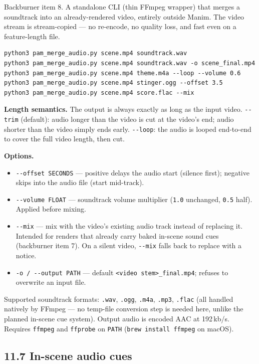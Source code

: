 \documentclass[
  12pt,
  letterpaper,
]{book}
\begin{document}
Backburner item 8. A standalone CLI (thin FFmpeg wrapper) that merges
a soundtrack into an already-rendered video, entirely outside Manim.
The video stream is stream-copied --- no re-encode, no quality loss,
and fast even on a feature-length file.

\begin{verbatim}
python3 pam_merge_audio.py scene.mp4 soundtrack.wav
python3 pam_merge_audio.py scene.mp4 soundtrack.wav -o scene_final.mp4
python3 pam_merge_audio.py scene.mp4 theme.m4a --loop --volume 0.6
python3 pam_merge_audio.py scene.mp4 stinger.ogg --offset 3.5
python3 pam_merge_audio.py scene.mp4 score.flac --mix
\end{verbatim}

\textbf{Length semantics.} The output is always exactly as long as
the input video. \texttt{-{}-trim} (default): audio longer than the
video is cut at the video's end; audio shorter than the video simply
ends early. \texttt{-{}-loop}: the audio is looped end-to-end to cover
the full video length, then cut.

\textbf{Options.}

\begin{itemize}
\item
  \texttt{-{}-offset\ SECONDS} --- positive delays the audio start
  (silence first); negative skips into the audio file (start
  mid-track).
\item
  \texttt{-{}-volume\ FLOAT} --- soundtrack volume multiplier
  (\texttt{1.0} unchanged, \texttt{0.5} half). Applied before mixing.
\item
  \texttt{-{}-mix} --- mix with the video's existing audio track
  instead of replacing it. Intended for renders that already carry
  baked in-scene sound cues (backburner item 7). On a silent video,
  \texttt{-{}-mix} falls back to replace with a notice.
\item
  \texttt{-o\ /\ -{}-output\ PATH} --- default
  \texttt{\textless{}video\ stem\textgreater{}\_final.mp4}; refuses to
  overwrite an input file.
\end{itemize}

Supported soundtrack formats: \texttt{.wav}, \texttt{.ogg},
\texttt{.m4a}, \texttt{.mp3}, \texttt{.flac} (all handled natively by
FFmpeg --- no temp-file conversion step is needed here, unlike the
planned in-scene cue system). Output audio is encoded AAC at
192\,kb/s. Requires \texttt{ffmpeg} and \texttt{ffprobe} on
\texttt{PATH} (\texttt{brew\ install\ ffmpeg} on macOS).

\subsection{\texorpdfstring{11.7 In-scene audio
cues}{11.7 In-scene audio cues}}\label{in-scene-audio-cues}
\end{document}
